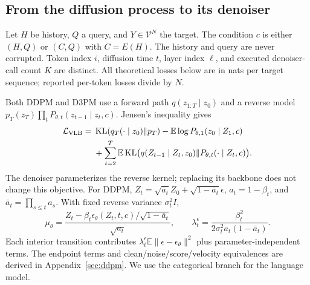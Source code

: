 \documentclass{article}
\theoremstyle{remark}\newtheorem{remark}[theorem]{Remark}
\newcommand{\E}{\mathbb E}
\newcommand{\KL}{\operatorname{KL}}
\begin{document}
\subsection{From the diffusion process to its denoiser}
Let $H$ be history, $Q$ a query, and $Y\in\mathcal V^N$ the target. The condition $c$ is either $(H,Q)$ or $(C,Q)$ with $C=E(H)$. The history and query are never corrupted. Token index $i$, diffusion time $t$, layer index $\ell$, and executed denoiser-call count $K$ are distinct. All theoretical losses below are in nats per target sequence; reported per-token losses divide by $N$.

Both DDPM and D3PM use a forward path $q(z_{1:T}\mid z_0)$ and a reverse model $p_T(z_T)\prod_t P_{\theta,t}(z_{t-1}\mid z_t,c)$. Jensen's inequality gives
\begin{align}
\mathcal L_{\rm VLB}
={}&\KL(q_T(\cdot\mid z_0)\Vert p_T)
-\E\log P_{\theta,1}(z_0\mid Z_1,c)\nonumber\\
&+\sum_{t=2}^{T}\E\KL\bigl(q(Z_{t-1}\mid Z_t,z_0)\Vert P_{\theta,t}(\cdot\mid Z_t,c)\bigr).
\label{m:vlb}
\end{align}
The denoiser parameterizes the reverse kernel; replacing its backbone does not change this objective. For DDPM, $Z_t=\sqrt{\bar a_t}Z_0+\sqrt{1-\bar a_t}\epsilon$, $a_t=1-\beta_t$, and $\bar a_t=\prod_{s\le t}a_s$. With fixed reverse variance $\sigma_t^2I$,
\begin{equation}
\mu_\theta=\frac{Z_t-\beta_t\epsilon_\theta(Z_t,t,c)/\sqrt{1-\bar a_t}}{\sqrt{a_t}},
\qquad
\lambda_t^\epsilon=\frac{\beta_t^2}{2\sigma_t^2a_t(1-\bar a_t)}.
\label{m:ddpm}
\end{equation}
Each interior transition contributes $\lambda_t^\epsilon\E\|\epsilon-\epsilon_\theta\|^2$ plus parameter-independent terms. The endpoint terms and clean/noise/score/velocity equivalences are derived in Appendix~\ref{sec:ddpm}. We use the categorical branch for the language model.
\end{document}
